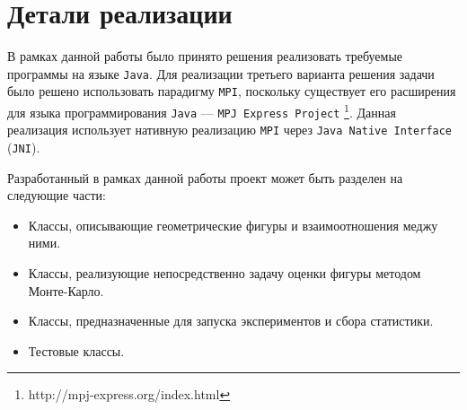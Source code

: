 \section{Детали реализации}

В рамках данной работы было принято решения реализовать требуемые программы на языке \texttt{Java}. Для реализации третьего варианта 
решения задачи было решено использовать парадигму \texttt{MPI}, поскольку существует его расширения для языка программирования 
\texttt{Java} --- \texttt{MPJ Express Project} \footnote{http://mpj-express.org/index.html}. Данная реализация использует нативную
реализацию \texttt{MPI} через \texttt{Java Native Interface} (\texttt{JNI}).

Разработанный в рамках данной работы проект может быть разделен на следующие части:
\begin{itemize}
    \item Классы, описывающие геометрические фигуры и взаимоотношения меджу ними.
    \item Классы, реализующие непосредственно задачу оценки фигуры методом Монте-Карло.
    \item Классы, предназначенные для запуска экспериментов и сбора статистики.
    \item Тестовые классы.
\end{itemize}

